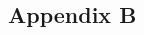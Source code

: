\begin{landscapemode}{297mm}{420mm} %
    \chapter{Appendix B}
    \blindtext[5]
\end{landscapemode}